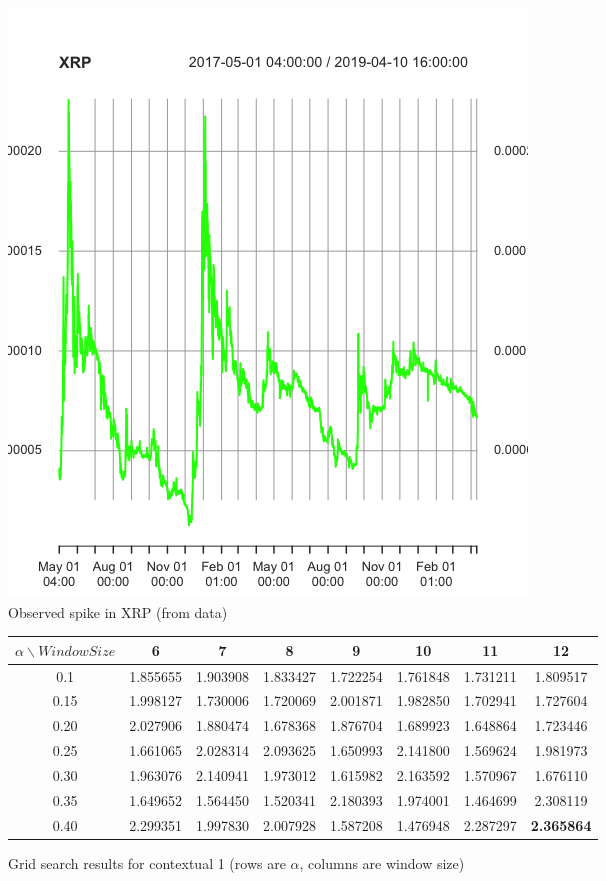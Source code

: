 \documentclass[a4paper,12pt]{article}
\begin{document}
\begin{figure}[htp]
  \centering
  \includegraphics[scale=0.3]{figures/xrp.png}
  \caption{Observed spike in XRP (from data)}
  \label{xrp}
\end{figure}

\begin{figure}[htp]
	\centering
		\begin{tabular}{|c|c|c|c|c|c|c|c|}
		\hline
		$\alpha \backslash Window Size$ & 6 & 7 & 8 & 9 & 10 & 11 & 12 \\ \hline
		0.1 & 1.855655 & 1.903908 & 1.833427 & 1.722254 & 1.761848 & 1.731211 & 1.809517 \\ \hline
		0.15 & 1.998127 & 1.730006 & 1.720069 & 2.001871 & 1.982850 & 1.702941 & 1.727604 \\ \hline
		0.20 & 2.027906 & 1.880474 & 1.678368 & 1.876704 & 1.689923 & 1.648864 & 1.723446 \\ \hline
		0.25 & 1.661065 & 2.028314 & 2.093625 & 1.650993 & 2.141800 & 1.569624 & 1.981973 \\ \hline
		0.30 & 1.963076 & 2.140941 & 1.973012 & 1.615982 & 2.163592 & 1.570967 & 1.676110 \\ \hline
		0.35 & 1.649652 & 1.564450 & 1.520341 & 2.180393 & 1.974001 & 1.464699 & 2.308119 \\ \hline
		0.40 & 2.299351 & 1.997830 & 2.007928 & 1.587208 & 1.476948 & 2.287297 & \textbf{2.365864} \\ \hline
		\end{tabular}
	\caption{Grid search results for contextual 1 (rows are $\alpha$, columns are window size)}
	\label{gridsearch1}
\end{figure}
\end{document}
